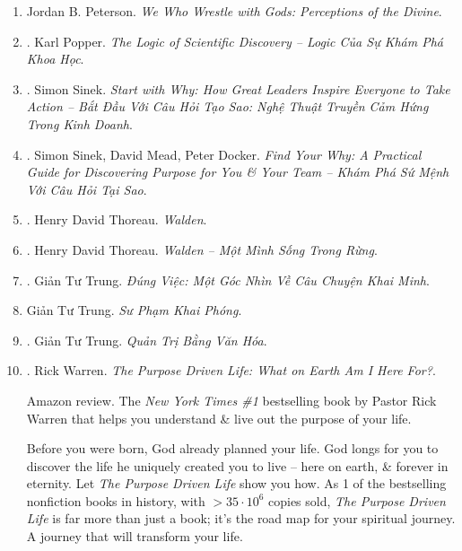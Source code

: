 \documentclass{article}
\begin{document}
\begin{enumerate}
	\item {\sc Jordan B. Peterson}. {\it We Who Wrestle with Gods: Perceptions of the Divine}.
	
	\item \cite{Popper_logic_khoa_hoc}. {\sc Karl Popper}. {\it The Logic of Scientific Discovery -- Logic Của Sự Khám Phá Khoa Học}.\hfill{\sf[done]}
	
	\item \cite{Sinek_start_why}. {\sc Simon Sinek}. {\it Start with Why: How Great Leaders Inspire Everyone to Take Action -- Bắt Đầu Với Câu Hỏi Tạo Sao: Nghệ Thuật Truyền Cảm Hứng Trong Kinh Doanh}.\hfill{\sf[done]}
	
	\item \cite{Sinek_Mead_Docker_why}. {\sc Simon Sinek, David Mead, Peter Docker}. {\it Find Your Why: A Practical Guide for Discovering Purpose for You \& Your Team -- Khám Phá Sứ Mệnh Với Câu Hỏi Tại Sao}.\hfill{\sf[done]}
	
	\item \cite{Thoreau_Walden}. {\sc Henry David Thoreau}. {\it Walden}.\hfill{\sf[reading]}
	
	\item \cite{Thoreau_Walden_VN}. {\sc Henry David Thoreau}. {\it Walden -- Một Mình Sống Trong Rừng}.\hfill{\sf[done]}
	
	\item \cite{Trung_dung_viec}. {\sc Giản Tư Trung}. {\it Đúng Việc: Một Góc Nhìn Về Câu Chuyện Khai Minh}.\hfill{\sf[done]}
	
	\item {\sc Giản Tư Trung}. {\it Sư Phạm Khai Phóng}.
	
	\item \cite{Trung_van_hoa}. {\sc Giản Tư Trung}. {\it Quản Trị Bằng Văn Hóa}.\hfill{\sf[done]}
	
	\item \cite{Warren_purpose_driven_life}. {\sc Rick Warren}. {\it The Purpose Driven Life: What on Earth Am I Here For?}. {}
	
	{\sf Amazon review.} The {\it New York Times \#1} bestselling book by Pastor {\sc Rick Warren} that helps you understand \& live out the purpose of your life.
	
	Before you were born, God already planned your life. God longs for you to discover the life he uniquely created you to live -- here on earth, \& forever in eternity. Let {\it The Purpose Driven Life} show you how. As 1 of the bestselling nonfiction books in history, with $> 35\cdot10^6$ copies sold, {\it The Purpose Driven Life} is far more than just a book; it's the road map for your spiritual journey. A journey that will transform your life.
	

\end{enumerate}
\end{document}

